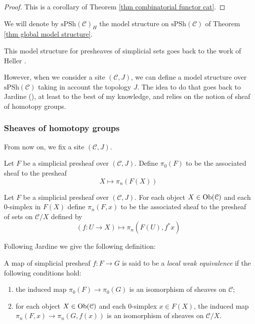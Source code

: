 \begin{refsection}
\begin{proof}
This is a corollary of Theorem \ref{thm combinatorial functor cat}.
\end{proof}

We will denote by $\mathrm{sPSh}(\mathcal C)_H$ the model structure on $\mathrm{sPSh}(\mathcal C)$ of Theorem \ref{thm global model structure}.

\begin{rmk}
This model structure for presheaves of simplicial sets goes back to the work of Heller \cite{heller}.
\end{rmk}

However, when we consider a site $(\mathcal C, J)$, we can define a model structure over $\mathrm{sPSh}(\mathcal C)$ taking in account the topology $J$. The idea to do that goes back to Jardine (\cite{jardinepresheaves}), at least to the best of my knowledge, and relies on the notion of sheaf of homotopy groups.

\subsubsection{Sheaves of homotopy groups}

From now on, we fix a site $(\mathcal C, J)$.

\begin{defin}
Let $F$ be a simplicial presheaf over $(\mathcal C,J)$. Define $\pi_0(F)$ to be the associated sheaf to the presheaf
\[
X \mapsto \pi_n(F(X))
\]
\end{defin}

\begin{defin}
Let $F$ be a simplicial presheaf over $(\mathcal C,J)$. For each object $X \in \operatorname{Ob}(\mathcal C)$ and each $0$-simplex in $F(X)$ define $\pi_n(F,x)$ to be the associated sheaf to the presheaf of sets on $\mathcal C / X$ defined by
\[
(f \colon U \to X) \mapsto \pi_n(F(U),f^*x)
\]
\end{defin}

Following Jardine \cite{jardinepresheaves} we give the following definition:

\begin{defin}
A map of simplicial presheaf $f \colon F \to G$ is said to be a \emph{local weak equivalence} if the following conditions hold:
\begin{enumerate}
\item the induced map $\pi_0(F) \to \pi_0(G)$ is an isomorphism of sheaves on $\mathcal C$;

\item for each object $X \in \operatorname{Ob}(\mathcal C)$ and each 0-simplex $x \in F(X)$, the induced map $\pi_n(F,x) \to \pi_n(G,f(x))$ is an isomorphism of sheaves on $\mathcal C / X$.
\end{enumerate}
\end{defin}


\end{refsection}
